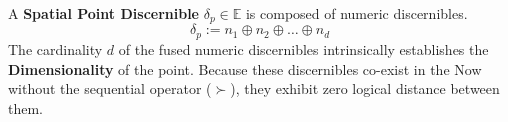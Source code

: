 



\begin{formalism}
    A \textbf{Spatial Point Discernible} $\delta_p \in \mathbb{E}$ is
    composed of numeric discernibles.
    \begin{equation}
        \delta_p := n_1 \oplus n_2 \oplus \dots \oplus n_d
    \end{equation}
    The cardinality $d$ of the fused numeric discernibles intrinsically
    establishes the \textbf{Dimensionality} of the point. Because these
    discernibles co-exist in the Now without the sequential operator
    ($\succ$), they exhibit zero logical distance between them.
\end{formalism}



